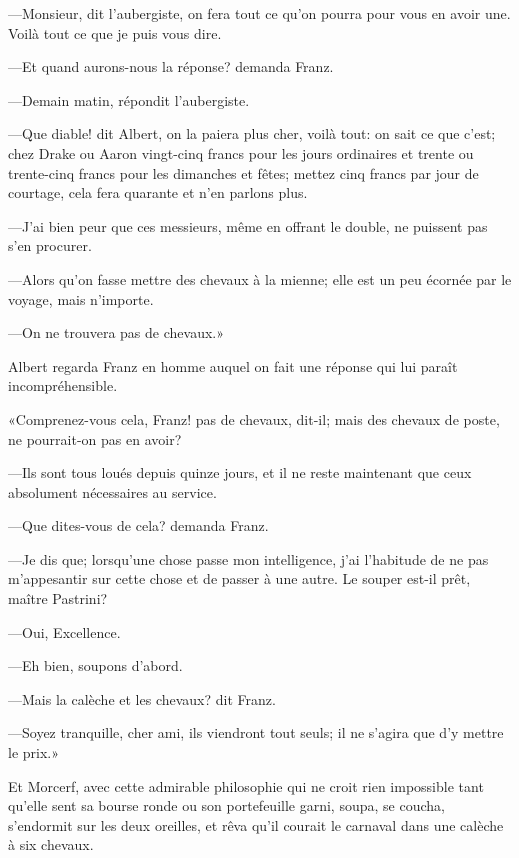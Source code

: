 —Monsieur, dit l'aubergiste, on fera tout ce qu'on pourra pour vous en avoir une. Voilà tout ce que je puis vous dire. 

—Et quand aurons-nous la réponse? demanda Franz. 

—Demain matin, répondit l'aubergiste. 

—Que diable! dit Albert, on la paiera plus cher, voilà tout: on sait ce que c'est; chez Drake ou Aaron vingt-cinq francs pour les jours ordinaires et trente ou trente-cinq francs pour les dimanches et fêtes; mettez cinq francs par jour de courtage, cela fera quarante et n'en parlons plus. 

—J'ai bien peur que ces messieurs, même en offrant le double, ne puissent pas s'en procurer. 

—Alors qu'on fasse mettre des chevaux à la mienne; elle est un peu écornée par le voyage, mais n'importe. 

—On ne trouvera pas de chevaux.» 

Albert regarda Franz en homme auquel on fait une réponse qui lui paraît incompréhensible. 

«Comprenez-vous cela, Franz! pas de chevaux, dit-il; mais des chevaux de poste, ne pourrait-on pas en avoir? 

—Ils sont tous loués depuis quinze jours, et il ne reste maintenant que ceux absolument nécessaires au service. 

—Que dites-vous de cela? demanda Franz. 

—Je dis que; lorsqu'une chose passe mon intelligence, j'ai l'habitude de ne pas m'appesantir sur cette chose et de passer à une autre. Le souper est-il prêt, maître Pastrini? 

—Oui, Excellence. 

—Eh bien, soupons d'abord. 

—Mais la calèche et les chevaux? dit Franz. 

—Soyez tranquille, cher ami, ils viendront tout seuls; il ne s'agira que d'y mettre le prix.» 

Et Morcerf, avec cette admirable philosophie qui ne croit rien impossible tant qu'elle sent sa bourse ronde ou son portefeuille garni, soupa, se coucha, s'endormit sur les deux oreilles, et rêva qu'il courait le carnaval dans une calèche à six chevaux. 